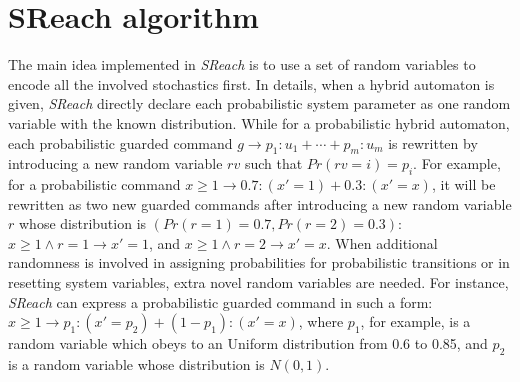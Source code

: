 \section{SReach algorithm}
The main idea implemented in {\it SReach} is to use a set of random variables to encode all the involved stochastics first. In details, when a hybrid automaton is given, {\it SReach} directly declare each probabilistic system parameter as one random variable with the known distribution. While for a probabilistic hybrid automaton, each probabilistic guarded command $g \rightarrow p_1:u_1 + \cdots + p_m:u_m$ is rewritten by introducing a new random variable $rv$ such that $Pr(rv = i) = p_i$. For example, for a probabilistic command $x \geq 1 \to 0.7 : (x' = 1)+ 0.3 :( x' = x)$, it will be rewritten as two new guarded commands after introducing a new random variable $r$ whose distribution is $(Pr(r=1)=0.7, Pr(r=2)=0.3)$: $x \geq 1 \wedge r = 1 \to x'=1$, and $x \geq 1 \wedge r = 2 \to x'=x$. When additional randomness is involved in assigning probabilities for probabilistic transitions or in resetting system variables, extra novel random variables are needed. For instance, {\it SReach} can express a probabilistic guarded command in such a form: $x \geq 1 \to p_1 : (x' = p_2 )+ (1-p_1) :( x' = x)$, where $p_1$, for example, is a random variable which obeys to an Uniform distribution from 0.6 to 0.85, and $p_2$ is a random variable whose distribution is $N(0,1)$.

